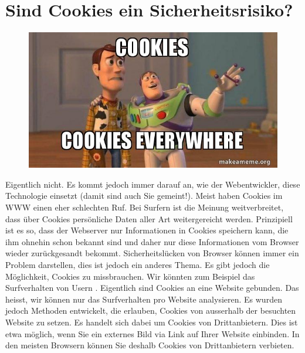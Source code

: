 
\cookiesPhpLernziele

\section{Sind Cookies ein Sicherheitsrisiko?}


\begin{figure}
\vspace{-\baselineskip}
\centering
\includegraphics[scale=0.5]{cookies_cookies_everywhere}
\end{figure}

Eigentlich nicht. Es kommt jedoch immer darauf an, wie der Webentwickler, diese Technologie einsetzt (damit sind auch Sie gemeint!). Meist haben Cookies im \ac{WWW} einen eher schlechten Ruf. Bei Surfern ist die Meinung weitverbreitet, dass über Cookies persönliche Daten aller Art weitergereicht werden. Prinzipiell ist es so, dass der Webserver nur Informationen in Cookies speichern kann, die ihm ohnehin schon bekannt sind und daher nur diese Informationen vom Browser wieder zurückgesandt bekommt. Sicherheitslücken von Browser können immer ein Problem darstellen, dies ist jedoch ein anderes Thema. Es gibt jedoch die Möglichkeit, Cookies zu missbrauchen. Wir könnten zum Beispiel das Surfverhalten von Usern . Eigentlich sind Cookies an eine Website gebunden. Das heisst, wir können nur das Surfverhalten pro Website analysieren. Es wurden jedoch Methoden entwickelt, die erlauben, Cookies von ausserhalb der besuchten Website zu setzen. Es handelt sich dabei um Cookies von Drittanbietern. Dies ist etwa möglich, wenn Sie ein externes Bild via Link auf Ihrer Website einbinden. In den meisten Browsern können Sie deshalb Cookies von Drittanbietern verbieten.

